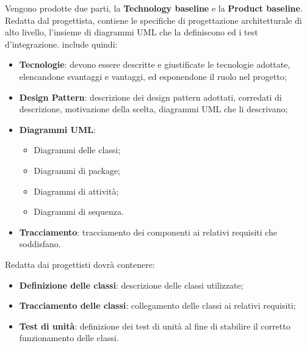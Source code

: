 		Vengono prodotte due parti, la \textbf{Technology baseline} e la \textbf{Product baseline}.
		Redatta dal progettista, contiene le specifiche di progettazione architetturale di alto livello, l'insieme di diagrammi UML che la definiscono ed i test d'integrazione.\newline
		include quindi:
		\begin{itemize}
		    \item \textbf{Tecnologie}: devono essere descritte e giustificate le tecnologie adottate, elencandone svantaggi e vantaggi, ed esponendone il ruolo nel progetto;
		    \item \textbf{Design Pattern}: descrizione dei design pattern adottati, corredati di descrizione, motivazione della scelta, diagrammi UML che li descrivano;
		    \item \textbf{Diagrammi UML}:
		    \begin{itemize}
		        \item Diagrammi delle classi;
		        \item Diagrammi di package;
		        
		        \item Diagrammi di attività;
		        \item Diagrammi di sequenza.
		    \end{itemize}
		    \item \textbf{Tracciamento}: tracciamento dei componenti ai relativi requisiti che soddisfano.
		\end{itemize}
		Redatta dai progettisti dovrà contenere:
		\begin{itemize}
		    \item \textbf{Definizione delle classi}: descrizione delle classi utilizzate;
		    \item \textbf{Tracciamento delle classi}: collegamento delle classi ai relativi requisiti;
		    \item \textbf{Test di unità}: definizione dei test di unità al fine di stabilire il corretto funzionamento delle classi.
		\end{itemize}
